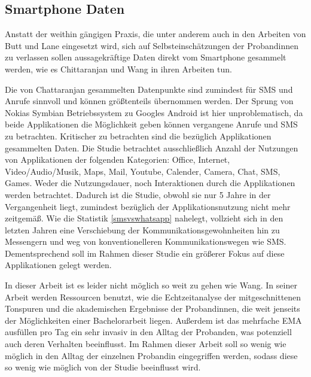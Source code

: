 \subsection{Smartphone Daten}

Anstatt der weithin gängigen Praxis, die unter anderem auch in den Arbeiten von Butt \cite{butt2008personality} und Lane \cite{lane2011impact}
eingesetzt wird, sich auf Selbsteinschätzungen der Probandinnen zu verlassen sollen aussagekräftige Daten direkt vom Smartphone gesammelt werden, 
wie es Chittaranjan \cite{chittaranjan2011s} und Wang \cite{wang2014istudentlife} in ihren Arbeiten tun.
\par
Die von Chattaranjan gesammelten Datenpunkte sind zumindest für SMS und Anrufe sinnvoll und können größtenteils übernommen werden.
Der Sprung von Nokias Symbian Betriebssystem zu Googles Android ist hier unproblematisch, da beide Applikationen die Möglichkeit geben können
vergangene Anrufe und SMS zu betrachten.
Kritischer zu betrachten sind die bezüglich Applikationen gesammelten Daten.
Die Studie betrachtet ausschließlich Anzahl der Nutzungen von Applikationen der folgenden Kategorien:
Office, Internet, Video/Audio/Musik, Maps, Mail, Youtube, Calender, Camera, Chat, SMS, Games.
Weder die Nutzungsdauer, noch Interaktionen durch die Applikationen werden betrachtet. 
Dadurch ist die Studie, obwohl sie nur 5 Jahre in der Vergangenheit liegt, zumindest bezüglich der Applikationsnutzung nicht mehr zeitgemäß.
Wie die Statistik \ref{smsvswhatsapp} nahelegt, vollzieht sich in den letzten Jahren eine Verschiebung der Kommunikationsgewohnheiten hin zu Messengern und weg von konventionelleren Kommunikationswegen wie SMS.
Dementsprechend soll im Rahmen dieser Studie ein größerer Fokus auf diese Applikationen gelegt werden.
\par
In dieser Arbeit ist es leider nicht möglich so weit zu gehen wie Wang.
In seiner Arbeit werden Ressourcen benutzt, wie die Echtzeitanalyse der mitgeschnittenen Tonspuren und die akademischen Ergebnisse der Probandinnen, die weit jenseits der Möglichkeiten einer Bachelorarbeit liegen.
Außerdem ist das mehrfache EMA ausfüllen pro Tag ein sehr invasiv in den Alltag der Probanden, was potenziell auch deren Verhalten beeinflusst.
Im Rahmen dieser Arbeit soll so wenig wie möglich in den Alltag der einzelnen Probandin eingegriffen werden, sodass diese so wenig wie möglich von der Studie beeinflusst wird.


